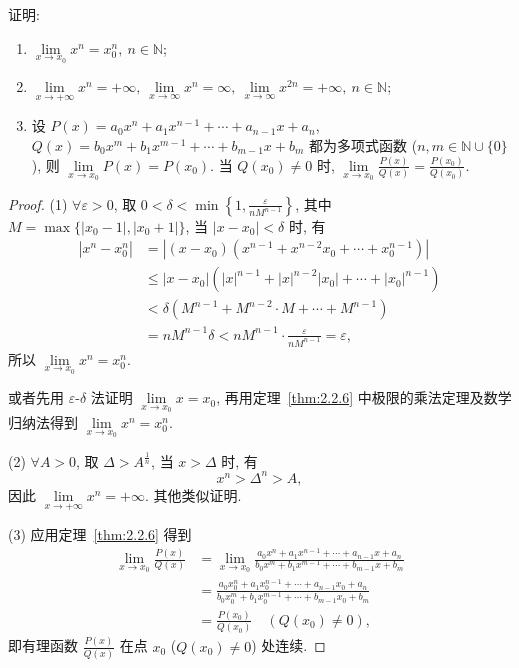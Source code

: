\begin{example}\label{ex:2.2.4}
证明:
\begin{enumerate}[label=(\arabic*)]
  \item $\lim\limits_{x \to x_0} x^n = x_0^n,\ n \in \mathbb{N}$;
  \item $\lim\limits_{x\to+\infty}x^{n}=+\infty,\ \lim\limits_{x\to\infty}x^{n}=\infty,\ \lim\limits_{x\to\infty}x^{2n}=+\infty,\ n\in\mathbb{N}$;
  \item 设 $P(x)=a_{0}x^{n}+a_{1}x^{n-1}+\cdots+a_{n-1}x+a_{n}$, $Q(x)=b_{0}x^{m}+b_{1}x^{m-1}+\cdots+b_{m-1}x+b_{m}$ 都为多项式函数 ($n, m \in \mathbb{N} \cup \{0\}$), 则 $\lim\limits_{x \to x_0} P(x) = P(x_0)$. 当 $Q(x_0) \neq 0$ 时, $\lim\limits_{x \to x_0} \frac{P(x)}{Q(x)} = \frac{P(x_0)}{Q(x_0)}$.
\end{enumerate}
\end{example}

\begin{proof}
(1) $\forall\varepsilon>0$, 取 $0<\delta<\min\left\{1,\frac{\varepsilon}{nM^{n-1}}\right\}$, 其中 $M=\max\{|x_0-1|,|x_0+1|\}$, 当 $|x-x_0|<\delta$ 时, 有
\begin{align*}
|x^{n}-x_{0}^{n}| &= |(x-x_{0})(x^{n-1}+x^{n-2}x_{0}+\cdots+x_{0}^{n-1})| \\
&\leqslant |x-x_{0}|(|x|^{n-1}+|x|^{n-2}|x_{0}|+\cdots+|x_{0}|^{n-1}) \\
&< \delta(M^{n-1}+M^{n-2}\cdot M+\cdots+M^{n-1}) \\
&= nM^{n-1}\delta < nM^{n-1}\cdot\frac{\varepsilon}{nM^{n-1}}=\varepsilon,
\end{align*}
所以 $\lim\limits_{x\to x_{0}}x^{n}=x_{0}^{n}$.

或者先用 $\varepsilon\text{-}\delta$ 法证明 $\lim\limits_{x\to x_0}x=x_0$, 再用定理~\ref{thm:2.2.6} 中极限的乘法定理及数学归纳法得到 $\lim\limits_{x\to x_0}x^n=x_0^n$.

(2) $\forall A>0$, 取 $\Delta>A^{\frac{1}{n}}$, 当 $x>\Delta$ 时, 有
\[
x^{n}>\Delta^{n}>A,
\]
因此 $\lim\limits_{x\to+\infty}x^{n}=+\infty$. 其他类似证明.

(3) 应用定理~\ref{thm:2.2.6} 得到
\begin{align*}
\lim_{x\to x_{0}}\frac{P(x)}{Q(x)} &= \lim_{x\to x_{0}}\frac{a_{0}x^{n}+a_{1}x^{n-1}+\cdots+a_{n-1}x+a_{n}}{b_{0}x^{m}+b_{1}x^{m-1}+\cdots+b_{m-1}x+b_{m}} \\
&= \frac{a_{0}x_{0}^{n}+a_{1}x_{0}^{n-1}+\cdots+a_{n-1}x_{0}+a_{n}}{b_{0}x_{0}^{m}+b_{1}x_{0}^{m-1}+\cdots+b_{m-1}x_{0}+b_{m}} \\
&= \frac{P(x_{0})}{Q(x_{0})} \quad (Q(x_0)\neq 0),
\end{align*}
即有理函数 $\frac{P(x)}{Q(x)}$ 在点 $x_{0}$ ($Q(x_{0})\neq 0$) 处连续.
\end{proof}

